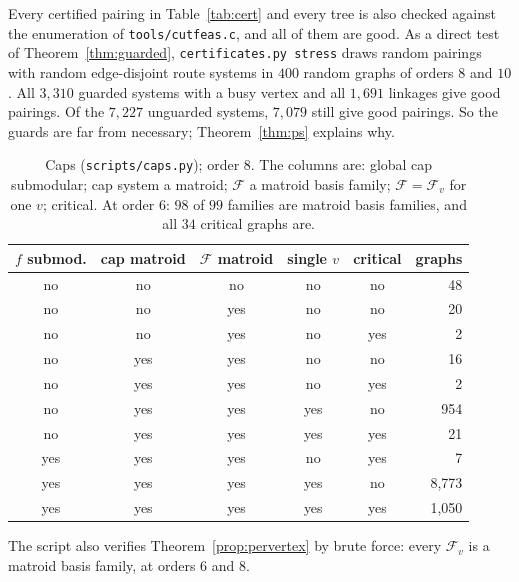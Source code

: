 \documentclass[11pt]{amsart}
\theoremstyle{definition}
\newcommand{\cF}{\mathcal F}
\begin{document}
Every certified pairing in Table~\ref{tab:cert} and every tree is also checked against the enumeration
of \texttt{tools/cutfeas.c}, and all of them are good. As a direct test of Theorem~\ref{thm:guarded},
\texttt{certificates.py stress} draws random pairings with random edge-disjoint route systems in $400$
random graphs of orders $8$ and $10$. All $3{,}310$ guarded systems with a busy vertex and all
$1{,}691$ linkages give good pairings. Of the $7{,}227$ unguarded systems, $7{,}079$ still give good
pairings. So the guards are far from necessary; Theorem~\ref{thm:ps} explains why.

\begin{table}[h]
\caption{Caps (\texttt{scripts/caps.py}); order $8$. The columns are: global cap submodular; cap system a
matroid; $\cF$ a matroid basis family; $\cF=\cF_v$ for one $v$; critical. At order $6$: $98$ of $99$
families are matroid basis families, and all $34$ critical graphs are.}\label{tab:caps}
\begin{tabular}{cccccr}
\toprule
$f$ submod. & cap matroid & $\cF$ matroid & single $v$ & critical & graphs\\
\midrule
no & no & no & no & no & 48\\
no & no & yes & no & no & 20\\
no & no & yes & no & yes & 2\\
no & yes & yes & no & no & 16\\
no & yes & yes & no & yes & 2\\
no & yes & yes & yes & no & 954\\
no & yes & yes & yes & yes & 21\\
yes & yes & yes & no & yes & 7\\
yes & yes & yes & yes & no & 8{,}773\\
yes & yes & yes & yes & yes & 1{,}050\\
\bottomrule
\end{tabular}
\end{table}

The script also verifies Theorem~\ref{prop:pervertex} by brute force: every $\cF_v$ is a matroid
basis family, at orders $6$ and $8$.
\end{document}
